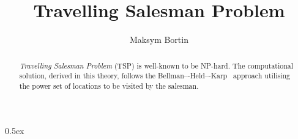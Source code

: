 \documentclass[11pt,a4paper]{article}
\begin{document}
\title{Travelling Salesman Problem}
\author{Maksym Bortin}

\maketitle

\begin{abstract}
\emph{Travelling Salesman Problem} (TSP) is well-known to be NP-hard.
The computational solution, derived in this theory,
follows the Bellman–-Held–-Karp~\cite{Bellman62, HK61} approach 
utilising the power set of locations to be visited by the salesman.
\end{abstract}

\tableofcontents

\parindent 0pt\parskip 0.5ex





\end{document}
